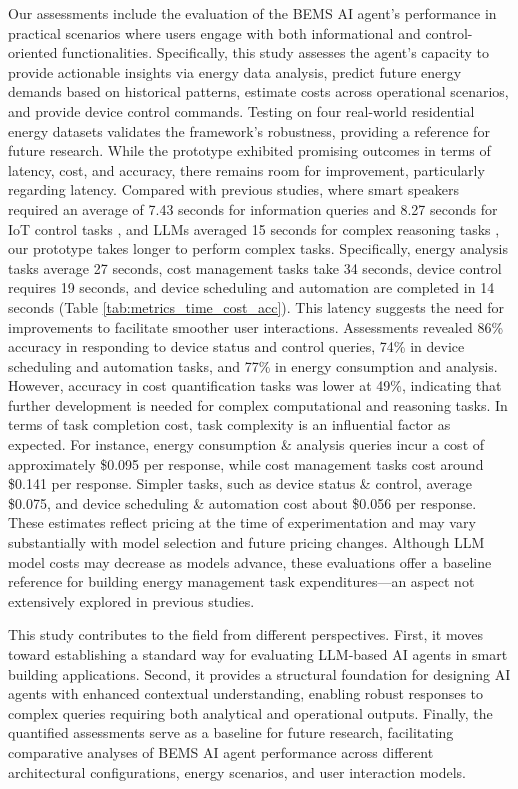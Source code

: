 \documentclass[final,3p,times]{elsarticle}
\begin{document}
Our assessments include the evaluation of the BEMS AI agent’s performance in practical scenarios where users engage with both informational and control-oriented functionalities. Specifically, this study assesses the agent’s capacity to provide actionable insights via energy data analysis, predict future energy demands based on historical patterns, estimate costs across operational scenarios, and provide device control commands. Testing on four real-world residential energy datasets validates the framework's robustness, providing a reference for future research. While the prototype exhibited promising outcomes in terms of latency, cost, and accuracy, there remains room for improvement, particularly regarding latency. Compared with previous studies, where smart speakers required an average of 7.43 seconds for information queries and 8.27 seconds for IoT control tasks \cite{mun2020smart}, and LLMs averaged 15 seconds for complex reasoning tasks \cite{chen2024livemind}, our prototype takes longer to perform complex tasks. Specifically, energy analysis tasks average 27 seconds, cost management tasks take 34 seconds, device control requires 19 seconds, and device scheduling and automation are completed in 14 seconds (Table \ref{tab:metrics_time_cost_acc}). This latency suggests the need for improvements to facilitate smoother user interactions. Assessments revealed 86\% accuracy in responding to device status and control queries, 74\% in device scheduling and automation tasks, and 77\% in energy consumption and analysis. However, accuracy in cost quantification tasks was lower at 49\%, indicating that further development is needed for complex computational and reasoning tasks. In terms of task completion cost, task complexity is an influential factor as expected. For instance, energy consumption \& analysis queries incur a cost of approximately \$0.095 per response, while cost management tasks cost around \$0.141 per response. Simpler tasks, such as device status \& control, average \$0.075, and device scheduling \& automation cost about \$0.056 per response. These estimates reflect pricing at the time of experimentation and may vary substantially with model selection and future pricing changes. Although LLM model costs may decrease as models advance, these evaluations offer a baseline reference for building energy management task expenditures---an aspect not extensively explored in previous studies.

This study contributes to the field from different perspectives. First, it moves toward establishing a standard way for evaluating LLM-based AI agents in smart building applications. Second, it provides a structural foundation for designing AI agents with enhanced contextual understanding, enabling robust responses to complex queries requiring both analytical and operational outputs. Finally, the quantified assessments serve as a baseline for future research, facilitating comparative analyses of BEMS AI agent performance across different architectural configurations, energy scenarios, and user interaction models.
\end{document}
